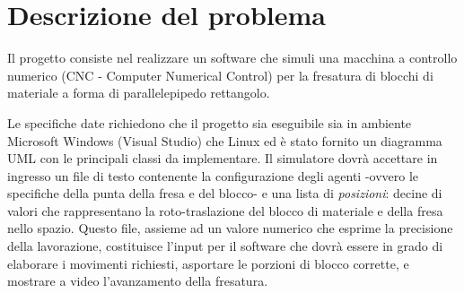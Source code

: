 \section{Descrizione del problema}
Il progetto consiste nel realizzare un software che simuli una macchina a controllo numerico (CNC - Computer Numerical Control) per la fresatura di blocchi di materiale a forma di parallelepipedo rettangolo.

Le specifiche date richiedono che il progetto sia eseguibile sia in ambiente Microsoft Windows (Visual Studio) che Linux ed è stato fornito un diagramma UML con le principali classi da implementare. Il simulatore dovrà accettare in ingresso un file di testo contenente la configurazione degli agenti -ovvero le specifiche della punta della fresa e del blocco- e una lista di \emph{posizioni}: decine di valori che rappresentano la roto-traslazione del blocco di materiale e della fresa nello spazio. Questo file, assieme ad un valore numerico che esprime la precisione della lavorazione, costituisce l'input per il software che dovrà essere in grado di elaborare i movimenti richiesti, asportare le porzioni di blocco corrette, e mostrare a video l'avanzamento della fresatura.
